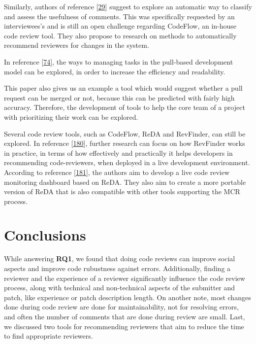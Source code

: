 \documentclass[]{book}
\begin{document}
Similarly, authors of reference
{[}\protect\hyperlink{ref-bird2015lessons}{29}{]} suggest to explore an
automatic way to classify and assess the usefulness of comments. This
was specifically requested by an interviewees's and is still an open
challenge regarding CodeFlow, an in-house code review tool. They also
propose to research on methods to automatically recommend reviewers for
changes in the system.

In reference {[}\protect\hyperlink{ref-gousios2014exploratory}{74}{]},
the ways to managing tasks in the pull-based development model can be
explored, in order to increase the efficiency and readability.

This paper also gives us an example a tool which would suggest whether a
pull request can be merged or not, because this can be predicted with
fairly high accuracy. Therefore, the development of tools to help the
core team of a project with prioritizing their work can be explored.

Several code review tools, such as CodeFlow, ReDA and RevFinder, can
still be explored. In reference
{[}\protect\hyperlink{ref-thongtanunam2015should}{180}{]}, further
research can focus on how RevFinder works in practice, in terms of how
effectively and practically it helps developers in recommending
code-reviewers, when deployed in a live development environment.
According to reference
{[}\protect\hyperlink{ref-thongtanunam2014reda}{181}{]}, the authors aim
to develop a live code review monitoring dashboard based on ReDA. They
also aim to create a more portable version of ReDA that is also
compatible with other tools supporting the MCR process.

\section{Conclusions}\label{conclusions}

While answering \textbf{RQ1}, we found that doing code reviews can
improve social aspects and improve code rubustness against errors.
Additionally, finding a reviewer and the experience of a reviewer
significantly influence the code review process, along with technical
and non-technical aspects of the submitter and patch, like experience or
patch description length. On another note, most changes done during code
review are done for maintainability, not for resolving errors, and often
the number of comments that are done during review are small. Last, we
discussed two tools for recommending reviewers that aim to reduce the
time to find appropriate reviewers.
\end{document}
